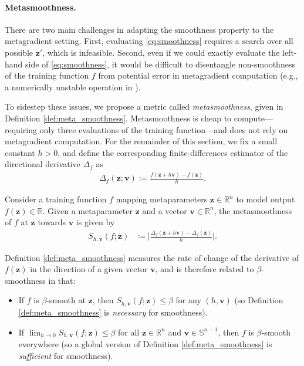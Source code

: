\paragraph{Metasmoothness.}
There are two main challenges in adapting the
smoothness property to the
metagradient setting.
First, evaluating \eqref{eq:smoothness} requires a search over all
possible $\mathbf{z}'$,
which is infeasible.
Second, even if we could exactly evaluate the left-hand side of
\eqref{eq:smoothness},
it would be difficult to disentangle non-smoothness of the training function $f$
from potential error in metagradient computation (e.g., a numerically unstable
operation in \replay{}).

To sidestep these issues, we propose a metric called {\em metasmoothness},
given in Definition \ref{def:meta_smoothness}.
Metasmoothness is cheap to compute---requiring only three evaluations of the
training function---and does not rely on metagradient computation.
For the remainder of this section, we fix a small constant $h > 0$,
and define the corresponding
finite-differences estimator of the directional derivative $\Delta_f$ as
\begin{align*}
  \Delta_f(\mathbf{z}; \mathbf{v}) := \frac{f(\mathbf{z} +
  h\mathbf{v}) - f(\mathbf{z})}{h}.
\end{align*}

\begin{definition}
  \label{def:meta_smoothness}
  Consider a training function $f$ mapping metaparameters $\mathbf{z}
  \in \mathbb{R}^n$
  to model output $f(\mathbf{z}) \in \mathbb{R}$.
  Given a metaparameter $\mathbf{z}$ and
  a vector $\mathbf{v} \in \mathbb{R}^n$,
  the metasmoothness of $f$ at $\mathbf{z}$ towards $\mathbf{v}$ is given by
  \begin{align}
    \label{eq:meta_smoothness_approx}
    S_{h, \mathbf{v}}(f; \mathbf{z})
    &\coloneqq
    \bigg|\frac{\Delta_f(\mathbf{z} + h \mathbf{v}) -
    \Delta_f(\mathbf{z})}{h} \bigg|.
  \end{align}
\end{definition}
\noindent
Definition \ref{def:meta_smoothness} measures the rate of change of
the derivative of $f(\mathbf{z})$ in the direction of a given vector
$\mathbf{v}$,
and is therefore related to $\beta$-smoothness in that:
\begin{itemize}
  \item[(a)] If $f$ is $\beta$-smooth at $\mathbf{z}$, then $S_{h,
    \mathbf{v}}(f; \mathbf{z}) \leq \beta$ for any $(h, \mathbf{v})$
    (so Definition \ref{def:meta_smoothness} is {\em necessary} for smoothness).
  \item[(b)] If $\lim_{h \to 0} S_{h, \mathbf{v}}(f; \mathbf{z}) \leq
    \beta$ for all $\mathbf{z} \in \mathbb{R}^n$ and $\mathbf{v} \in
    \mathbb{S}^{n-1}$,
    then $f$ is $\beta$-smooth everywhere
    (so a global version of Definition \ref{def:meta_smoothness} is
    {\em sufficient} for smoothness).
\end{itemize}

